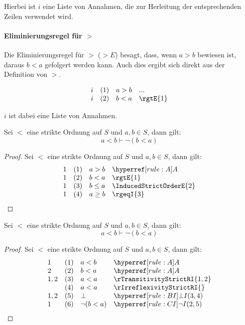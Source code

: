 \documentclass[main.tex]{subfiles}
\begin{document}
Hierbei ist \(i\) eine Liste von Annahmen, die zur Herleitung der entsprechenden Zeilen verwendet wird.

\paragraph{Eliminierungsregel für \(>\)}
\label{rule:rgtE}
Die Eliminierungsregel für \(>\) (\(> E\)) besagt, dass, wenn \(a > b\) bewiesen ist, daraus \(b < a\) gefolgert werden kann. Auch dies ergibt sich direkt aus der Definition von \(>\).

\[
\begin{array}{llll}
    i & (1) & a > b & \text{...} \\
    i & (2) & b < a & \rgtE{1} \\
\end{array}
\]

\(i\) ist dabei eine Liste von Annahmen.

\label{aGneqbImpaGeqb}
\begin{theorem}
Sei \(<\) eine strikte Ordnung auf \(S\) und \(a,b\in  S\), dann gilt:
\[a<b\vdash \neg(b<a)\]
\end{theorem}
\begin{proof}
    Sei \(<\) eine strikte Ordnung auf \(S\) und \(a,b\in  S\), dann gilt:
	\[
	\begin{array}{llll}
		1   & (1) & a > b & \rA\\
            1   & (2) & b<a & \rgtE{1}\\
		1   & (3) & b\leq a & \InducedStrictOrderE{2}\\
            1   & (4) & a\geq b & \rgeqI{3}\\
	\end{array}
	\]
\end{proof}



\label{aLneqbImpnLpbLneqaRp}
\begin{theorem}
Sei \(<\) eine strikte Ordnung auf \(S\) und \(a,b\in  S\), dann gilt:
\[a<b\vdash \neg(b<a)\]
\end{theorem}
\begin{proof}
    Sei \(<\) eine strikte Ordnung auf \(S\) und \(a,b\in  S\), dann gilt:
	\[
	\begin{array}{llll}
		1   & (1) & a<b & \rA\\
        2   & (2) & b<a & \rA\\
		1,2 & (3) & a<a & \rTransitivityStrictRI{1,2}\\
            & (4) & a<a & \rIrreflexivityStrictRI{}\\
        1,2 & (5) & \bot & \rBI{3,4}\\
        1   & (6) & \neg(b<a) & \rCI{2,5}\\
	\end{array}
	\]
\end{proof}
\end{document}
